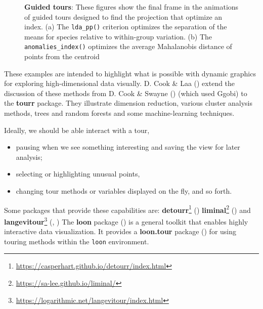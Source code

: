 \documentclass[
  letterpaper,
  10pt,
  krantz2]{krantz}
\providecommand{\tightlist}{%
  \setlength{\itemsep}{0pt}\setlength{\parskip}{0pt}}\usepackage{longtable,booktabs,array}
\providecommand{\href}[2]{#2\footnote{\url{#1}}}
\begin{document}
{\begin{figure}
\begin{minipage}{0.50\linewidth}
{}


\end{minipage}%

\caption{\label{fig-peng-tour-guided}\textbf{Guided tours}: These
figures show the final frame in the animations of guided tours designed
to find the projection that optimize an index. (a) The
\texttt{lda\_pp()} criterion optimizes the separation of the means for
species relative to within-group variation. (b) The
\texttt{anomalies\_index()} optimizes the average Mahalanobis distance
of points from the centroid}

\end{figure}%

These examples are intended to highlight what is possible with dynamic
graphics for exploring high-dimensional data visually. D. Cook \& Laa
() extend the discussion of these
methods from D. Cook \& Swayne ()
(which used Ggobi) to the \textbf{tourr} package. They illustrate
dimension reduction, various cluster analysis methods, trees and random
forests and some machine-learning techniques.

Ideally, we should be able interact with a tour,

\begin{itemize}
\tightlist
\item
  pausing when we see something interesting and saving the view for
  later analysis;
\item
  selecting or highlighting unusual points,
\item
  changing tour methods or variables displayed on the fly, and so forth.
\end{itemize}

Some packages that provide these capabilities are:
\href{https://casperhart.github.io/detourr/index.html}{\textbf{detourr}}
()
\href{https://sa-lee.github.io/liminal/}{\textbf{liminal}}
() and
\href{https://logarithmic.net/langevitour/index.html}{\textbf{langevitour}}
(,
) The \textbf{loon} package
() is a general toolkit
that enables highly interactive data visualization. It provides a
\textbf{loon.tour} package () for using touring methods within the \texttt{loon} environment.

}
\end{document}
